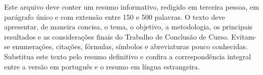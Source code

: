 
\begin{resumotcc}
Este arquivo deve conter um resumo informativo, redigido em terceira pessoa, em parágrafo único e com extensão entre 150 e 500 palavras. O texto deve apresentar, de maneira concisa, o tema, o objetivo, a metodologia, os principais resultados e as considerações finais do Trabalho de Conclusão de Curso. Evitam-se enumerações, citações, fórmulas, símbolos e abreviaturas pouco conhecidas. Substitua este texto pelo resumo definitivo e confira a correspondência integral entre a versão em português e o resumo em língua estrangeira.

\end{resumotcc}
